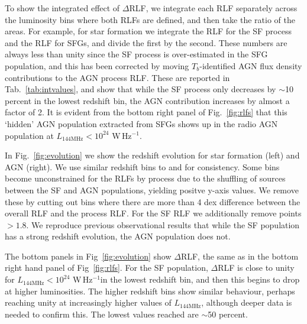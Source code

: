 \documentclass[usenatbib,fleqn,letters]{mnras}
\newcommand{\wphz}{$\,$W$\,$Hz$^{-1}$}
\newcommand{\llof}{$L_{\textrm{144MHz}}$}
\begin{document}
To show the integrated effect of $\Delta$RLF, we integrate each RLF separately across the luminosity bins where both RLFs are defined, and then take the ratio of the areas. For example, for star formation we integrate the RLF for the SF process and the RLF for SFGs, and divide the first by the second. These numbers are always less than unity since the SF process is over-estimated in the SFG population, and this has been corrected by moving $T_b$-identified AGN flux density contributions to the AGN process RLF. These are reported in Tab.~\ref{tab:intvalues}, and show that while the SF process  only decreases by $\sim$10 percent in the lowest redshift bin, the AGN contribution increases by almost a factor of 2. It is evident from the bottom right panel of Fig.~\ref{fig:rlfs} that this `hidden' AGN population extracted from SFGs shows up in the radio AGN population at $L_{\textrm{144MHz}} < 10^{24}\,$\wphz .


In Fig.~\ref{fig:evolution} we show the redshift evolution for star formation (left) and AGN (right).  We use similar redshift bins to \cite{kondapally_cosmic_2022} and \cite{cochrane_lofar_2023} for consistency. Some bins become unconstrained for the RLFs by process due to the shuffling of sources between the SF and AGN populations, yielding positve y-axis values. We remove these by cutting out bins where there are more than 4 dex difference between the overall RLF and the process RLF. For the SF RLF we additionally remove points $>1.8$. We reproduce previous observational results that while the SF population has a strong redshift evolution, the AGN population does not. 

The bottom panels in Fig~\ref{fig:evolution} show $\Delta$RLF, the same as in the bottom right hand panel of Fig~\ref{fig:rlfs}. For the SF population, $\Delta$RLF is close to unity for $L_{\textrm{144MHz}} < 10^{24}\,$\wphz in the lowest redshift bin, and then this begins to drop at higher luminosities. The higher redshift bins show similar behaviour, perhaps reaching unity at increasingly higher values of $L_{\textrm{144MHz}}$, although deeper data is needed to confirm this. The lowest values reached are $\sim$50 percent. 
\end{document}
